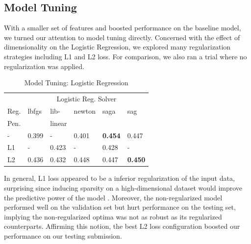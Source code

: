 \documentclass[11pt,a4paper]{article}
\begin{document}
\subsection{Model Tuning}%
\label{sub:model_tuning}


With a smaller set of features and boosted performance on the baseline model, we turned our attention to model tuning directly. Concerned with the effect of dimensionality on the Logistic Regression, we explored many regularization strategies including L1 and L2 loss. For comparison, we also ran a trial where no regularization was applied.

\begin{table}[h]
    \centering
    \caption{Model Tuning: Logistic Regression}
    \begin{tabular}{
    	l
        l
        l
        l
        l
        l
        }
        \toprule
        \multicolumn{1}{c}{} &
        \multicolumn{5}{c}{Logistic Reg. Solver}\\
        \cmidrule(lr){2-6} 
        {Reg.}& {lbfgs} &{lib-} &{newton}&{saga}& {sag}\\
        {Pen.} & {} &{linear}& {}&&{}\\
        \midrule
        - & 0.399 & - & 0.401 & \textbf{0.454} & 0.447\\
        L1 & - & 0.423 &  -&0.428& -\\
        L2 & 0.436& 0.432& 0.448& 0.447& \textbf{0.450}\\
        \bottomrule
    \end{tabular}
\end{table}

In general, L1 loss appeared to be a inferior regularization of the input data, surprising since inducing sparsity on a high-dimensional dataset would improve the predictive power of the model \cite{turney2010frequency}. Moreover, the non-regularized model performed well on the validation set but hurt performance on the testing set, implying the non-regularized optima was not as robust as its regularized counterparts. Affirming this notion, the best L2 loss configuration boosted our performance on our testing submission. 
\end{document}

